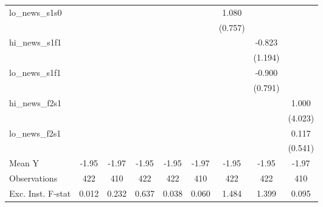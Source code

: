 {\begin{tabular}{l*{8}{c}}
\addlinespace
lo\_news\_s1s0&                     &                     &                     &                     &                     &       1.080         &                     &                     \\
            &                     &                     &                     &                     &                     &     (0.757)         &                     &                     \\
\addlinespace
hi\_news\_s1f1&                     &                     &                     &                     &                     &                     &      -0.823         &                     \\
            &                     &                     &                     &                     &                     &                     &     (1.194)         &                     \\
\addlinespace
lo\_news\_s1f1&                     &                     &                     &                     &                     &                     &      -0.900         &                     \\
            &                     &                     &                     &                     &                     &                     &     (0.791)         &                     \\
\addlinespace
hi\_news\_f2s1&                     &                     &                     &                     &                     &                     &                     &       1.000         \\
            &                     &                     &                     &                     &                     &                     &                     &     (4.023)         \\
\addlinespace
lo\_news\_f2s1&                     &                     &                     &                     &                     &                     &                     &       0.117         \\
            &                     &                     &                     &                     &                     &                     &                     &     (0.541)         \\
\midrule
Mean Y      &       -1.95         &       -1.97         &       -1.95         &       -1.95         &       -1.97         &       -1.95         &       -1.95         &       -1.97         \\
Observations&         422         &         410         &         422         &         422         &         410         &         422         &         422         &         410         \\
Exc. Inst. F-stat&       0.012         &       0.232         &       0.637         &       0.038         &       0.060         &       1.484         &       1.399         &       0.095         \\
\bottomrule
\end{tabular}
}
